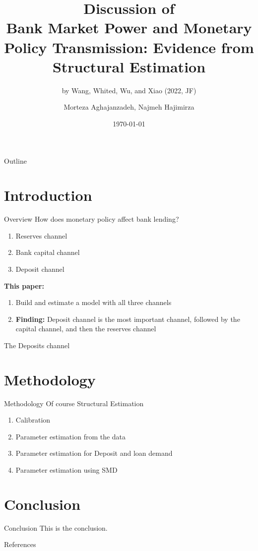 \documentclass{beamer}
\title[Monetary Policy
Transmission]{Discussion of\\ \textbf{Bank Market Power and Monetary Policy Transmission: Evidence from Structural Estimation}}
\subtitle{by Wang, Whited, Wu, and Xiao (2022, JF)}
\author[Morteza, Najmeh]{Morteza Aghajanzadeh, Najmeh Hajimirza}
\institute[HH Finance]{Households Finance}
\date{\today}
\begin{document}
\begin{frame}
    \titlepage
\end{frame}

\begin{frame}{Outline}
    \tableofcontents
\end{frame}

\section{Introduction}

\begin{frame}{Overview}
    How does monetary policy affect bank lending?\\
    \begin{enumerate}
        \item Reserves channel
        \item Bank capital channel
        \item Deposit channel
    \end{enumerate}
    \vspace{0.5cm}
    \textbf{This paper:} 
    \begin{enumerate}
        \item Build and estimate a model with all three channels
        \item \textbf{Finding:} Deposit channel is the most important channel, followed by the capital channel, and then the reserves channel
    \end{enumerate}
\end{frame}
\begin{frame}{The Deposits channel}
    
    

\end{frame}

\section{Methodology}

\begin{frame}{Methodology}
    Of course Structural Estimation\\
    \vspace{0.5cm}
    \begin{enumerate}
        \item Calibration
        \item Parameter estimation from the data
        \item Parameter estimation for Deposit and loan demand
        \item Parameter estimation using SMD
    \end{enumerate}
\end{frame}

\section{Conclusion}

\begin{frame}{Conclusion}
    This is the conclusion.
\end{frame}



\scriptsize 
	\begin{frame}[allowframebreaks]{References}
			

		
	\end{frame}
	
	\normalsize
\end{document}
